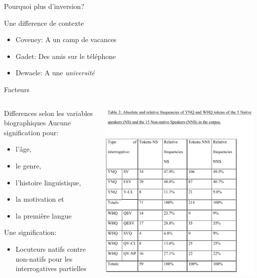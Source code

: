 \documentclass{beamer}
\begin{document}
    \begin{frame}{Pourquoi plus d'inversion?}
      \begin{block}{Une difference de contexte}
        \begin{itemize}
          \item Coveney: A un camp de vacances
          \item Gadet: Des amis sur le téléphone
          \item Dewaele: A une \emph{université}
        \end{itemize}
      \end{block}
    \end{frame}

    \begin{frame}[t]{Facteurs}
      \begin{columns}
          \begin{block}{Differences selon les variables biographiques}
            Aucune signification pour:
            \begin{itemize}
              \item l'âge,
              \item le genre,
              \item l'histoire linguistique,
              \item la motivation et
              \item la première langue
            \end{itemize}
            Une signification:
            \begin{itemize}
              \item Locuteurs natifs contre non-natifs pour les interrogatives partielles
            \end{itemize}
          \end{block}
          \includegraphics[scale=0.32]{resultats.jpg}

\end{columns}
\end{frame}
\end{document}
